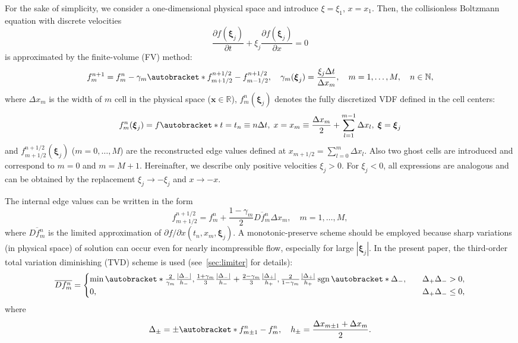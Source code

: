 \documentclass{elsarticle} %
\newcommand{\pder}[2][]{\frac{\partial#1}{\partial#2}}
\newcommand{\Pder}[2][]{\partial#1/\partial#2}
\DeclarePairedDelimiter\autobracket()       %
\newcommand{\br}[1]{\autobracket*{#1}}
\DeclareMathOperator{\sgn}{sgn}
\newcommand{\bxi}{\boldsymbol{\xi}}
\newcommand{\bx}{\boldsymbol{x}}
\begin{document}
For the sake of simplicity, we consider a one-dimensional physical space
and introduce \(\xi = \xi_1\), \(x = x_1\).
Then, the collisionless Boltzmann equation with discrete velocities
\begin{equation}\label{eq:transport}
    \pder[f(\bxi_j)]{t} + \xi_j\pder[f(\bxi_j)]{x} = 0
\end{equation}
is approximated by the finite-volume (FV) method:
\begin{equation}\label{eq:finite_volume}
    f^{n+1}_m = f^n_m - \gamma_m\br{f^{n+1/2}_{m+1/2} - f^{n+1/2}_{m-1/2}}, \quad
    \gamma_m(\bxi_j) = \frac{\xi_j\Delta{t}}{\Delta{x_m}}, \quad
    m = 1,\dots,M, \quad n\in\mathbb{N},
\end{equation}
where \(\Delta{x_m}\) is the width of \(m\) cell in the physical space (\(\bx\in\mathbb{R}\)),
\(f^n_m(\bxi_j)\) denotes the fully discretized VDF defined in the cell centers:
\begin{equation}\label{eq:vdf_fv}
    f^n_m(\bxi_j) = f\br{
        t = t_n \equiv n\Delta{t}, \;
        x = x_m \equiv \frac{\Delta{x_m}}2 + \sum_{l=1}^{m-1}\Delta{x_l}, \;
        \bxi = \bxi_j
    }
\end{equation}
and \(f^{n+1/2}_{m+1/2}(\bxi_j)\) (\(m = 0,\dots,M\)) are the reconstructed edge values
defined at \(x_{m+1/2} = \sum_{l=0}^m\Delta{x_l}\).
Also two ghost cells are introduced and correspond to \(m=0\) and \(m=M+1\).
Hereinafter, we describe only positive velocities \(\xi_j>0\).
For \(\xi_j<0\), all expressions are analogous
and can be obtained by the replacement \(\xi_j\to-\xi_j\) and \(x\to-x\).

The internal edge values can be written in the form
\begin{equation}\label{eq:internal_fluxes}
    f^{n+1/2}_{m+1/2} = f^n_m + \frac{1-\gamma_m}2\overline{Df^n_m}\Delta{x_m},
    \quad m = 1,\dots,M,
\end{equation}
where \(\overline{Df^n_m}\) is the limited approximation of \(\Pder[f]{x}(t_n, x_m, \bxi_j)\).
A monotonic-preserve scheme should be employed because sharp variations (in physical space)
of solution can occur even for nearly incompressible flow, especially for large \(|\bxi_j|\).
In the present paper, the third-order total variation diminishing (TVD) scheme is used
(see~\ref{sec:limiter} for details):
\begin{equation}\label{eq:limiter}
    \overline{Df^n_m} = \begin{cases}
        \min\br{
             \frac2{\gamma_m}\frac{|\Delta_-|}{h_-},
             \frac{1+\gamma_m}3\frac{|\Delta_-|}{h_-} + \frac{2-\gamma_m}3\frac{|\Delta_+|}{h_+},
             \frac2{1-\gamma_m}\frac{|\Delta_+|}{h_+}
        }\sgn\br{\Delta_-}, &\quad \Delta_+\Delta_- > 0, \\
        0, &\quad \Delta_+\Delta_- \leq 0,
    \end{cases}
\end{equation}
where
\begin{equation}\label{eq:differences}
    \Delta_\pm = \pm\br{f_{m\pm1}^n - f_m^n}, \quad h_\pm = \frac{\Delta{x_{m\pm1}} + \Delta{x_m}}2.
\end{equation}
\end{document}
